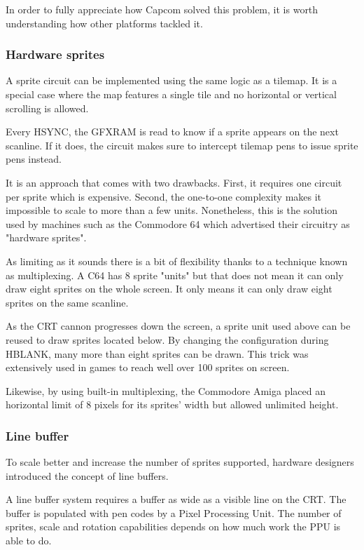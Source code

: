In order to fully appreciate how Capcom solved this problem, it is worth understanding how other platforms tackled it.

\subsubsection{Hardware sprites}
A sprite circuit can be implemented using the same logic as a tilemap. It is a special case where the map features a single tile and no  horizontal or vertical scrolling is allowed.

Every HSYNC, the GFXRAM is read to know if a sprite appears on the next scanline. If it does, the circuit makes sure to intercept tilemap pens to issue sprite pens instead. 

It is an approach that comes with two drawbacks. First, it requires one circuit per sprite which is expensive. Second, the one-to-one complexity makes it impossible to scale to more than a few units. Nonetheless, this is the solution used by machines such as the Commodore 64 which advertised their circuitry as "hardware sprites".


As limiting as it sounds there is a bit of flexibility thanks to a technique known as multiplexing. A C64 has 8 sprite "units" but that does not mean it can only draw eight sprites on the whole screen. It only means it can only draw eight sprites on the same scanline.

As the CRT cannon progresses down the screen, a sprite unit used above can be reused to draw sprites located below. By changing the configuration during HBLANK, many more than eight sprites can be drawn. This trick was extensively used in games to reach well over 100 sprites on screen.


Likewise, by using built-in multiplexing, the Commodore Amiga placed an horizontal limit of 8 pixels for its sprites' width but allowed unlimited height.

\subsubsection{Line buffer}
To scale better and increase the number of sprites supported, hardware designers introduced the concept of line buffers. 

A line buffer system requires a buffer as wide as a visible line on the CRT. The buffer is populated with pen codes by a Pixel Processing Unit. The number of sprites, scale and rotation capabilities depends on how much work the PPU is able to do. 

